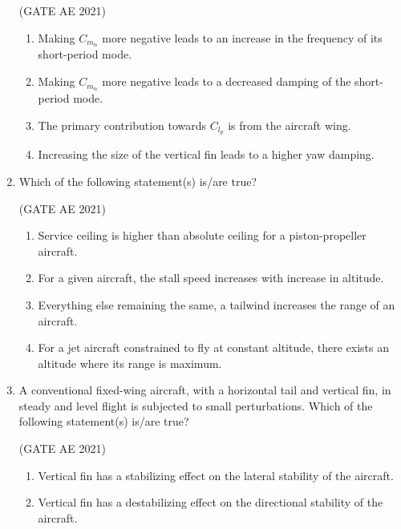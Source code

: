 \documentclass[journal,12pt,onecolumn]{IEEEtran}
\theoremstyle{remark}
\begin{document}
\begin{flushleft}
\begin{enumerate}
\hfill (GATE AE 2021)

\begin{enumerate}
\item Making $C_{m_\alpha}$ more negative leads to an increase in the frequency of its short-period mode.  

\item Making $C_{m_\alpha}$ more negative leads to a decreased damping of the short-period mode.  

\item The primary contribution towards $C_{l_p}$ is from the aircraft wing.  

\item Increasing the size of the vertical fin leads to a higher yaw damping.  

\end{enumerate}


\item  Which of the following statement(s) is/are true?

\hfill (GATE AE 2021)

\begin{enumerate}
\item Service ceiling is higher than absolute ceiling for a piston-propeller aircraft.

\item For a given aircraft, the stall speed increases with increase in altitude.

\item Everything else remaining the same, a tailwind increases the range of an aircraft.

\item For a jet aircraft constrained to fly at constant altitude, there exists an altitude where its range is maximum.
\end{enumerate}


\item  
A conventional fixed-wing aircraft, with a horizontal tail and vertical fin, in steady and level flight is subjected to small perturbations. Which of the following statement(s) is/are true?

\hfill (GATE AE 2021)


\begin{enumerate}
\item Vertical fin has a stabilizing effect on the lateral stability of the aircraft.

\item Vertical fin has a destabilizing effect on the directional stability of the aircraft.


\end{enumerate}
\end{enumerate}
\end{flushleft}
\end{document}
